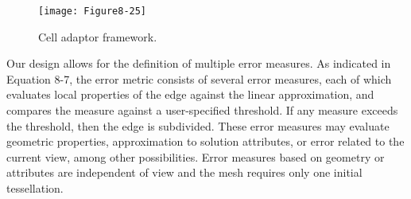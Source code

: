 \begin{wrapfigure}{R}{0.4\textwidth}
	\centering
	\texttt{[image: Figure8-25]}
	\caption{Cell adaptor framework.}
	\label{fig:Figure8-25}
\end{wrapfigure}

Our design allows for the definition of multiple error measures. As indicated in Equation 8-7, the error metric consists of several error measures, each of which evaluates local properties of the edge against the linear approximation, and compares the measure against a user-specified threshold. If any measure exceeds the threshold, then the edge is subdivided. These error measures may evaluate geometric properties, approximation to solution attributes, or error related to the current view, among other possibilities. Error measures based on geometry or attributes are independent of view and the mesh requires only one initial tessellation.

